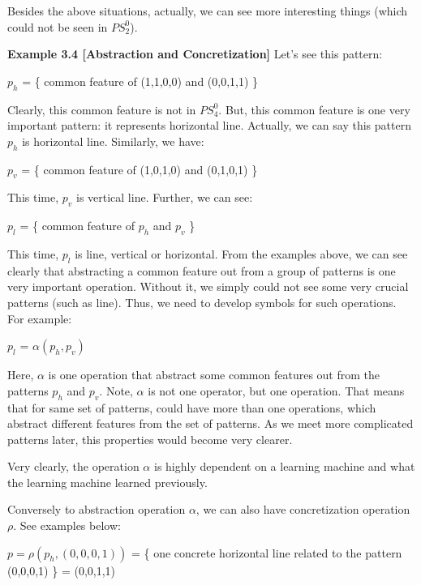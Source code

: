 Besides the above situations, actually, we can see more interesting things (which could not be seen in $PS^0_2$).


{\bf Example 3.4 [\bf Abstraction and Concretization]}
Let's see this pattern:

\begin{center}
$p_h$ = \{ common feature of (1,1,0,0) and (0,0,1,1) \} 
\end{center}  
Clearly, this common feature is not in $PS^0_4$. But, this common feature is one very important pattern: it represents horizontal line. Actually, we can say this pattern $p_h$ is horizontal line. Similarly, we have:  
\begin{center}
$p_v$ = \{ common feature of (1,0,1,0) and (0,1,0,1) \} 
\end{center}  

This time, $p_v$ is vertical line. Further, we can see:
\begin{center}
$p_l$ = \{ common feature of $p_h$ and $p_v$ \}
\end{center}

This time, $p_l$ is line, vertical or horizontal. From the examples above, we can see clearly that abstracting a common feature out from a group of patterns is one very important operation. Without it, we simply could not see some very crucial patterns (such as line). Thus, we need to develop symbols for such operations. For example:

\begin{center}
$p_l$ = $\alpha (p_h, p_v)$
\end{center}

Here, $\alpha$ is one operation that abstract some common features out from the patterns $p_h$ and $p_v$. Note, $\alpha$ is not one operator, but one operation. That means that for same set of patterns, could have more than one operations, which abstract different features from the set of patterns. As we meet more complicated patterns later, this properties would become very clearer.

Very clearly, the operation $\alpha$ is highly dependent on a learning machine and what the learning machine learned previously. 

Conversely to abstraction operation $\alpha$, we can also have concretization operation $\rho$. See examples below:
\begin{center}
$p = \rho(p_h, (0,0,0,1))$ = \{ one concrete horizontal line related to the pattern (0,0,0,1) \} = (0,0,1,1) 
\end{center}

